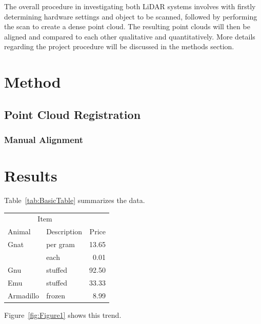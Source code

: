 \documentclass[man]{apa7}
\begin{document}
The overall procedure in investigating both LiDAR systems involves with firstly determining hardware settings and object to be scanned, followed by performing the scan to create a dense point cloud. The resulting point clouds will then be aligned and compared to each other qualitative and quantitatively. More details regarding the project procedure will be discussed in the methods section.



\section{Method}

\subsection{Point Cloud Registration}
\subsubsection{Manual Alignment}


\section{Results}
Table~\ref{tab:BasicTable} summarizes the data. \lipsum[1-3]
\vspace{20pt}

\begin{minipage}{\linewidth}
  \label{tab:BasicTable}
  \begin{tabular}{@{}llr@{}}         \toprule
  \multicolumn{2}{c}{Item}        \\ \cmidrule(r){1-2}
  Animal    & Description & Price \\ \midrule
  Gnat      & per gram    & 13.65 \\
            & each        &  0.01 \\
  Gnu       & stuffed     & 92.50 \\
  Emu       & stuffed     & 33.33 \\
  Armadillo & frozen      &  8.99 \\ \bottomrule
  \end{tabular}
\end{minipage}

\vspace{20pt}

\lipsum[1]

Figure~\ref{fig:Figure1} shows this trend.
\end{document}

